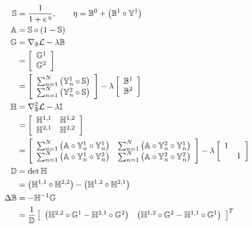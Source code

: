 \begin{align}
\mathbb{S} &= \frac{1}{1+e^{\thinspace\eta}},\qquad \eta = \mathbb{B}^0 + \left(\mathbb{B}^1\circ\mathbb{Y}^1\right)\\
\mathbb{A} &= \mathbb{S}\circ\left(1-\mathbb{S}\right)\\
\mathbb{G} &= \nabla_{\mathbb{B}}\mathcal{L} - \lambda\mathbb{B} \nonumber \\
&= \left[\begin{array}{c}
\mathbb{G}^1 \\ \mathbb{G}^2
\end{array}\right] \nonumber \\
&= \left[\begin{array}{c}
\sum_{n=1}^{N}\left( \mathbb{Y}_n^1\circ\mathbb{S} \right) \\
\sum_{n=1}^{N}\left( \mathbb{Y}_n^2\circ\mathbb{S} \right)
\end{array}\right] - \lambda\left[\begin{array}{c} \mathbb{B}^1 \\ \mathbb{B}^2\end{array}\right]\\
\mathbb{H} &= \nabla_{\mathbb{B}}^2\mathcal{L} -\lambda\mathbb{I} \nonumber \\
&= \left[\begin{array}{cc}
\mathbb{H}^{1,1} & \mathbb{H}^{1,2} \\ \mathbb{H}^{2,1} & \mathbb{H}^{2,2}
\end{array}\right] \nonumber \\
&= \left[\begin{array}{cc}
\sum_{n=1}^{N}\left( \mathbb{A}\circ\mathbb{Y}_n^1\circ\mathbb{Y}_n^1 \right) & 
\sum_{n=1}^{N}\left( \mathbb{A}\circ\mathbb{Y}_n^2\circ\mathbb{Y}_n^1 \right) \\
\sum_{n=1}^{N}\left( \mathbb{A}\circ\mathbb{Y}_n^1\circ\mathbb{Y}_n^2 \right) & 
\sum_{n=1}^{N}\left( \mathbb{A}\circ\mathbb{Y}_n^2\circ\mathbb{Y}_n^2 \right)
\end{array}\right] - \lambda\left[\begin{array}{cc} 1 & \\ & 1\end{array}\right]\\
\mathbb{D} &= \det{\mathbb{H}} \nonumber \\
&= \left(\mathbb{H}^{1,1}\circ\mathbb{H}^{2,2}\right) - \left(\mathbb{H}^{1,2}\circ\mathbb{H}^{2,1}\right) \\
\Delta\mathbb{B} &= -\mathbb{H}^{-1}\mathbb{G} \nonumber \\
&= \dfrac{1}{\mathbb{D}} \left[\begin{array}{cc}
\left(\mathbb{H}^{2,2}\circ\mathbb{G}^{1} - \mathbb{H}^{2,1}\circ\mathbb{G}^{2} \right) & 
\left(\mathbb{H}^{1,2}\circ\mathbb{G}^{2} - \mathbb{H}^{1,1}\circ\mathbb{G}^{1} \right)
\end{array}\right]^{T}
\end{align}
